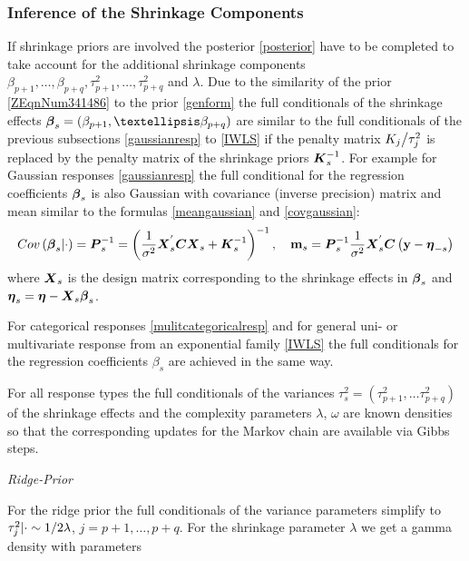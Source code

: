 \documentclass[11pt,a4paper,twoside]{bayesxarticle}
\begin{document}
\subsubsection{Inference of the Shrinkage Components}
\label{Inference_Shrinkage}

If shrinkage priors are involved the posterior \eqref{posterior} have to be completed to take account for the additional
shrinkage components $\beta _{p+1} ,\ldots,\beta _{p+q} ,\tau _{p+1}^{2} ,\ldots,\tau _{p+q}^{2} $ and $\lambda $. Due to the
similarity of the prior \eqref{ZEqnNum341486} to the prior \eqref{genform} the full conditionals of the shrinkage effects
$\betavec_{s} =\left(\beta _{p+1} ,\ldots \beta _{p+q} \right)$ are similar to the full conditionals of the previous subsections
\ref{gaussianresp} to \ref{IWLS} if the penalty matrix ${K_{j} \mathord{\left/ {\vphantom {K_{j}  \tau _{j}^{2} }} \right.
\kern-\nulldelimiterspace} \tau _{j}^{2} } $ is replaced by the penalty matrix of the shrinkage priors $\mbox{\boldmath $K$}_{s}^{-1} $. For example for
Gaussian responses \ref{gaussianresp} the full conditional for the regression coefficients $\boldsymbol{\beta}_{s} $ is also Gaussian with
covariance (inverse precision) matrix and mean similar to the formulas \eqref{meangaussian} and \eqref{covgaussian}:
\[Cov\left(\boldsymbol{\beta}_{s} |\cdot \right)=\mbox{\boldmath $P$}_{s}^{-1} =\left(\frac{1}{\sigma ^{2} } \mbox{\boldmath $X$}_{s}
^{{'} } \mbox{\boldmath $C$}\mbox{\boldmath $X$}_{s} +\mbox{\boldmath $K$}_{s}^{-1} \right)^{-1} ,\quad \mathbf{m}_{s} =\mbox{\boldmath $P$}_{s}^{-1} \frac{1}{\sigma ^{2}
} \mbox{\boldmath $X$}_{s} ^{{'} } \mbox{\boldmath $C$}\left(\mathbf{y}-\boldsymbol{\eta}_{-s} \right)\]
where $\mbox{\boldmath $X$}_{s} $ is the design matrix corresponding to the shrinkage effects in $\boldsymbol{\beta}_{s} $ and $\boldsymbol{\eta}_{s} =\boldsymbol{\eta} -\mbox{\boldmath $X$}_{s} \boldsymbol{\beta}_{s} $.

For categorical responses \ref{mulitcategoricalresp} and for general uni- or multivariate
response from an exponential family \ref{IWLS} the full conditionals for the
regression coefficients $\beta _{s} $ are achieved in the same way.

For all response types the full conditionals of the variances $\tau _{s}^{2} =\left(\tau _{p+1}^{2} ,\ldots\tau _{p+q}^{2}
\right)$ of the shrinkage effects and the complexity parameters $\lambda$, $\omega $ are known densities so that the
corresponding updates for the Markov chain are available via Gibbs steps.

{\em Ridge-Prior}

For the ridge prior the full conditionals of the variance parameters simplify to $\tau _{j}^{2} |\cdot \sim {1\mathord{\left/
{\vphantom {1 2\lambda }} \right. \kern-\nulldelimiterspace} 2\lambda } $, $j=p+1,\ldots,p+q$. For the shrinkage parameter $\lambda
$ we get a gamma density with parameters
\end{document}
